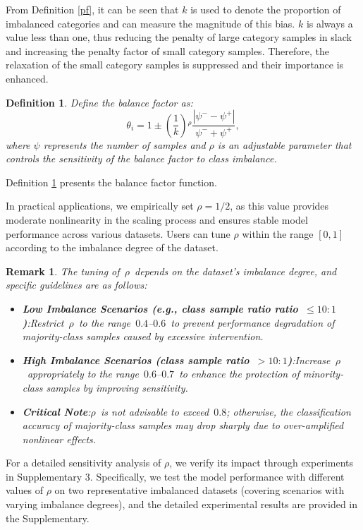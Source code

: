 \documentclass[a4paper]{cas-sc}
\newtheorem{myDef}{Definition}
\newtheorem{remark}{Remark}
\begin{document}
From Definition \ref{pf}, it can be seen that $k$ is used to denote the proportion of imbalanced categories and can measure the magnitude of this bias. $k$ is always a value less than one, thus reducing the penalty of large category samples in slack and increasing the penalty factor of small category samples. Therefore, the relaxation of the small category samples is suppressed and their importance is enhanced.

\begin{myDef}\label{bf}
Define the balance factor as:
\begin{equation}
{\theta _i} = 1 \pm (\frac{1}{k}){^\rho }\frac{{\left| {{\psi ^ - } - {\psi ^ + }} \right|}}{{{\psi ^ - } + {\psi ^ + }}},
\end{equation}
where $\psi$ represents the number of samples and $\rho$ is an adjustable parameter that controls the sensitivity of the balance factor to class imbalance. 

\end{myDef}
 
Definition \ref{bf} presents the balance factor function. {\color{orange}In practical applications, we empirically set $\rho = 1/2$, as this value provides moderate nonlinearity in the scaling process and ensures stable model performance across various datasets. Users can tune $\rho$ within the range $[0, 1]$ according to the imbalance degree of the dataset.
\begin{remark}\label{remark 1}
The tuning of \(\rho\) depends on the dataset's imbalance degree, and specific guidelines are as follows:\begin{itemize}\item \textbf{Low Imbalance Scenarios (e.g., class sample ratio ratio \(\leq 10:1\))}:Restrict \(\rho\) to the range \(0.4\)--\(0.6\) to prevent performance degradation of majority-class samples caused by excessive intervention.\item \textbf{High Imbalance Scenarios (class sample ratio \(> 10:1\))}:Increase \(\rho\) appropriately to the range \(0.6\)--\(0.7\) to enhance the protection of minority-class samples by improving sensitivity.\item \textbf{Critical Note}:\(\rho\) is not advisable to exceed \(0.8\); otherwise, the classification accuracy of majority-class samples may drop sharply due to over-amplified nonlinear effects.\end{itemize}\end{remark}
For a detailed sensitivity analysis of $\rho$, we verify its impact through experiments in Supplementary 3. Specifically, we test the model performance with different values of $\rho$ on two representative imbalanced datasets (covering scenarios with varying imbalance degrees), and the detailed experimental results are provided in the Supplementary.}
\end{document}
